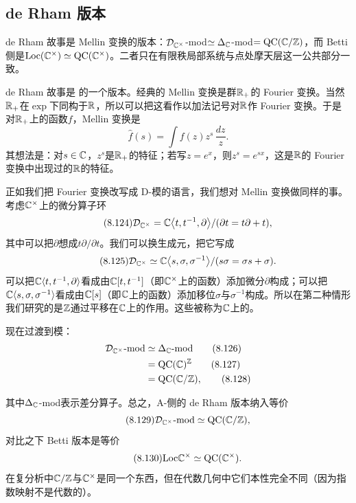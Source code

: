 \subsection{de Rham 版本}
\begin{sectionkey}
de Rham 故事是 Mellin 变换的版本：$\mathcal D_{\mathbb{C}^{\times}}$-mod$\simeq\Delta_{\mathbb{C}}$-mod$=\mathrm{QC}(\mathbb{C}/\mathbb{Z})$，而 Betti 侧是$\mathrm{Loc}(\mathbb{C}^{\times})\simeq\mathrm{QC}(\mathbb{C}^{\times})$。二者只在有限秩局部系统与点处摩天层这一公共部分一致。
\end{sectionkey}

de Rham 故事是  的一个版本。经典的 Mellin 变换是群$\mathbb{R}_{+}$的 Fourier 变换。当然$\mathbb{R}_{+}$在$\exp$下同构于$\mathbb{R}$，所以可以把这看作以加法记号对$\mathbb{R}$作 Fourier 变换。于是对$\mathbb{R}_{+}$上的函数$f$，Mellin 变换是
\begin{equation}\tag{8.123}
\widehat f(s)=\int f(z)z^{s}\,\frac{dz}{z}.
\end{equation}
其想法是：对$s\in\mathbb{C}$，$z^{s}$是$\mathbb{R}_{+}$的特征；若写$z=e^{x}$，则$z^{s}=e^{sx}$，这是$\mathbb{R}$的 Fourier 变换中出现过的$\mathbb{R}$的特征。

正如我们把 Fourier 变换改写成 D-模的语言，我们想对 Mellin 变换做同样的事。考虑$\mathbb{C}^{\times}$上的微分算子环
\begin{equation}\tag{8.124}
\mathcal D_{\mathbb{C}^{\times}}=\mathbb{C}\bigl\langle t,t^{-1},\partial\bigr\rangle/(\partial t=t\partial+t),
\end{equation}
其中可以把$\partial$想成$t\partial/\partial t$。我们可以换生成元，把它写成
\begin{equation}\tag{8.125}
\mathcal D_{\mathbb{C}^{\times}}\simeq\mathbb{C}\bigl\langle s,\sigma,\sigma^{-1}\bigr\rangle/(s\sigma=\sigma s+\sigma).
\end{equation}
可以把$\mathbb{C}\langle t,t^{-1},\partial\rangle$看成由$\mathbb{C}[t,t^{-1}]$（即$\mathbb{C}^{\times}$上的函数）添加微分$\partial$构成；可以把$\mathbb{C}\langle s,\sigma,\sigma^{-1}\rangle$看成由$\mathbb{C}[s]$（即$\mathbb{C}$上的函数）添加移位$\sigma$与$\sigma^{-1}$构成。所以在第二种情形我们研究的是$\mathbb{Z}$通过平移在$\mathbb{C}$上的作用。这些被称为$\mathbb{C}$上的。

现在过渡到模：
\begin{align}
\mathcal D_{\mathbb{C}^{\times}}\text{-mod}&\simeq\Delta_{\mathbb{C}}\text{-mod}\tag{8.126}\\
&=\mathrm{QC}(\mathbb{C})^{\mathbb{Z}}\tag{8.127}\\
&=\mathrm{QC}(\mathbb{C}/\mathbb{Z}),\tag{8.128}
\end{align}

其中$\Delta_{\mathbb{C}}$-mod表示差分算子。总之，A-侧的 de Rham 版本纳入等价
\begin{equation}\tag{8.129}
\mathcal D_{\mathbb{C}^{\times}}\text{-mod}\simeq\mathrm{QC}(\mathbb{C}/\mathbb{Z}),
\end{equation}
对比之下 Betti 版本是等价
\begin{equation}\tag{8.130}
\mathrm{Loc}\mathbb{C}^{\times}\simeq\mathrm{QC}(\mathbb{C}^{\times}).
\end{equation}
在复分析中$\mathbb{C}/\mathbb{Z}$与$\mathbb{C}^{\times}$是同一个东西，但在代数几何中它们本性完全不同（因为指数映射不是代数的）。

